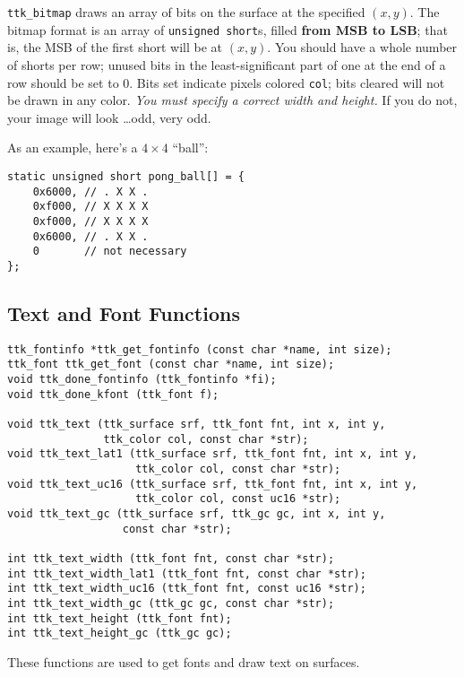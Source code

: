 \documentclass[12pt,letterpaper]{report}
\begin{document}
\verb|ttk_bitmap| draws an array of bits on the surface at the specified $(x,y)$. The bitmap format
is an array of \verb|unsigned short|s, filled {\bf from MSB to LSB}; that is, the MSB of the first
short will be at $(x,y)$. You should have a whole number of shorts per row; unused bits in the least-significant
part of one at the end of a row should be set to 0.
Bits set indicate pixels colored \verb|col|; bits cleared will not be
drawn in any color. {\it You must specify a correct width and height.} If you do not, your image will
look \ldots odd, very odd.

As an example, here's a $4\times4$ ``ball'':
\begin{verbatim}
static unsigned short pong_ball[] = {
    0x6000, // . X X .
    0xf000, // X X X X
    0xf000, // X X X X
    0x6000, // . X X .
    0       // not necessary
};
\end{verbatim}

\subsection{Text and Font Functions}
\begin{verbatim}
ttk_fontinfo *ttk_get_fontinfo (const char *name, int size);
ttk_font ttk_get_font (const char *name, int size);
void ttk_done_fontinfo (ttk_fontinfo *fi);
void ttk_done_kfont (ttk_font f);

void ttk_text (ttk_surface srf, ttk_font fnt, int x, int y,
               ttk_color col, const char *str);
void ttk_text_lat1 (ttk_surface srf, ttk_font fnt, int x, int y,
                    ttk_color col, const char *str);
void ttk_text_uc16 (ttk_surface srf, ttk_font fnt, int x, int y,
                    ttk_color col, const uc16 *str);
void ttk_text_gc (ttk_surface srf, ttk_gc gc, int x, int y,
                  const char *str);

int ttk_text_width (ttk_font fnt, const char *str);
int ttk_text_width_lat1 (ttk_font fnt, const char *str);
int ttk_text_width_uc16 (ttk_font fnt, const uc16 *str);
int ttk_text_width_gc (ttk_gc gc, const char *str);
int ttk_text_height (ttk_font fnt);
int ttk_text_height_gc (ttk_gc gc);
\end{verbatim}

These functions are used to get fonts and draw text on surfaces.
\end{document}
